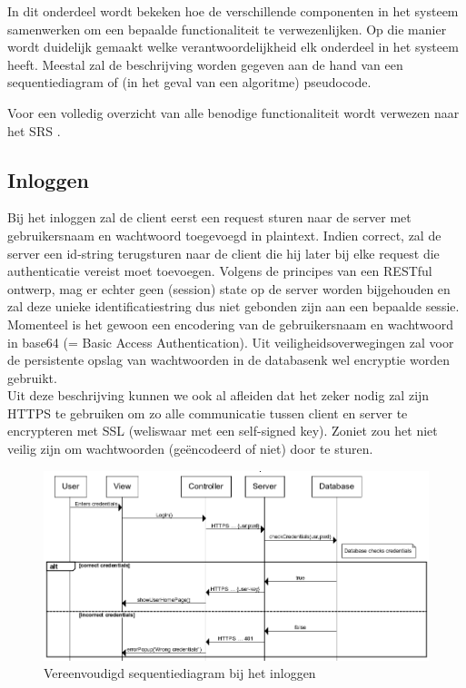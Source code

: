 \documentclass{article}
\begin{document}
In dit onderdeel wordt bekeken hoe de verschillende componenten in het systeem samenwerken om een bepaalde functionaliteit te verwezenlijken. Op die manier wordt duidelijk gemaakt welke verantwoordelijkheid elk onderdeel in het systeem heeft.
Meestal zal de beschrijving worden gegeven aan de hand van een sequentiediagram of (in het geval van een algoritme) pseudocode.

Voor een volledig overzicht van alle benodige functionaliteit wordt verwezen naar het SRS \cite{Xtreport:SRS}.

\subsection{Inloggen}

Bij het inloggen zal de client eerst een request sturen naar de server met gebruikersnaam en wachtwoord toegevoegd in plaintext. Indien correct, zal de server een id-string terugsturen naar de client die hij later bij elke request die authenticatie vereist moet toevoegen. Volgens de principes van een RESTful ontwerp, mag er echter geen (session) state op de server worden bijgehouden en zal deze unieke identificatiestring dus niet gebonden zijn aan een bepaalde sessie. Momenteel is het gewoon een encodering van de gebruikersnaam en wachtwoord in base64 (= Basic Access Authentication).
Uit veiligheidsoverwegingen zal voor de persistente opslag van wachtwoorden in de databasenk wel encryptie worden gebruikt. \\ 

Uit deze beschrijving kunnen we ook al afleiden dat het zeker nodig zal zijn HTTPS te gebruiken om zo alle communicatie tussen client en server te encrypteren met SSL (weliswaar met een self-signed key). Zoniet zou het niet veilig zijn om wachtwoorden (ge\"encodeerd of niet) door te sturen.

\begin{figure}[!h]
\centering
 \includegraphics[width=145mm]{login-sequence.png}
 \caption{Vereenvoudigd sequentiediagram bij het inloggen}
 \label{login-sequence}
\end{figure}
\end{document}
